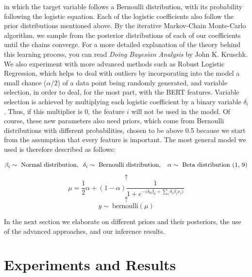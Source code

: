 \documentclass[man, floatsintext, 10pt]{apa6}
\begin{document}
in which the target variable follows a Bernoulli distribution, with its probability following the logistic equation. Each of the logistic coefficients also follow the prior distributions mentioned above. By the iterative Markov-Chain Monte-Carlo algorithm, we sample from the posterior distributions of each of our coefficients until the chains converge. For a more detailed explanation of the theory behind this learning process, you can read \textit{Doing Bayesian Analysis} by John K. Kruschk. We also experiment with more advanced methods such as Robust Logistic Regression, which helps to deal with outliers by incorporating into the model a small chance ($\alpha/2$) of a data point being randomly generated, and variable selection, in order to deal, for the most part, with the BERT features. Variable selection is achieved by multiplying each logistic coefficient by a binary variable $\delta_i$. Thus, if this multiplier is 0, the feature $i$ will not be used in the model. Of course, these new parameters also need priors, which come from Bernoulli distributions with different probabilities, chosen to be above 0.5 because we start from the assumption that every feature is important. The most general model we used is therefore described as follows:

 \[\beta_i \sim \text{ Normal distribution}, \hspace{2mm} \delta_i \sim \text{ Bernoulli distribution}, \hspace{2mm}\  \alpha \sim \text{ Beta distribution (1, 9)} \] \[ \uparrow \] \[ \mu = \frac{1}{2} \alpha + (1 - \alpha) \frac{1}{1 + e^{-\big(\delta_0 \beta_0 + \sum_i \delta_i \beta_i x_i \big)}} \] \vspace{0.01mm}  \[ \uparrow \] \[ y \sim\ \text{bernoulli} (\mu) \]
 
In the next section we elaborate on different priors and their posteriors, the use of the advanced approaches, and our inference results.

\section{Experiments and Results}
\end{document}
